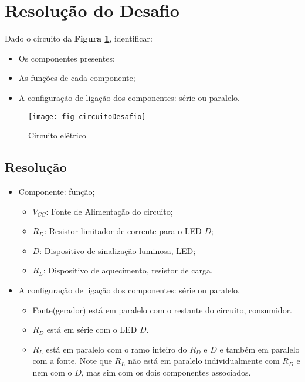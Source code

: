 \section{Resolução do Desafio}

\begin{minipage}{\linewidth}
  \centering
  \begin{minipage}{0.45\linewidth}
    Dado o circuito da \textbf{Figura \ref{fig:CircuitoDesafioResolucao}}, identificar:
    \begin{itemize}
      \item Os componentes presentes;
      \item As funções de cada componente;
      \item A configuração de ligação dos componentes: série ou paralelo.
    \end{itemize}
  \end{minipage}
  \hspace{0.05\linewidth}
  \begin{minipage}{0.45\linewidth}
    \begin{figure}[H]
      \centering
      \caption{Circuito elétrico}
      \label{fig:CircuitoDesafioResolucao}
      \texttt{[image: fig-circuitoDesafio]}
%
    \end{figure}
  \end{minipage}
\end{minipage}



\subsection{Resolução}

\begin{itemize}
  \item Componente: função;
  \begin{itemize}
    \item $V_{CC}$: Fonte de Alimentação do circuito;
    \item $R_D$: Resistor limitador de corrente para o LED $D$;
    \item $D$: Dispositivo de sinalização luminosa, LED;
    \item $R_L$: Dispositivo de aquecimento, resistor de carga.
  \end{itemize}

  \item A configuração de ligação dos componentes: série ou paralelo.
  \begin{itemize}
    \item Fonte(gerador) está em paralelo com o restante do circuito, consumidor.
    \item $R_D$ está em série com o LED $D$.
    \item $R_L$ está em paralelo com o ramo inteiro do $R_D$ e $D$ e também em paralelo com a fonte.
    Note que $R_L$ não está em paralelo individualmente com $R_D$ e nem com o $D$, mas sim com os dois componentes associados.
  \end{itemize}
\end{itemize}
